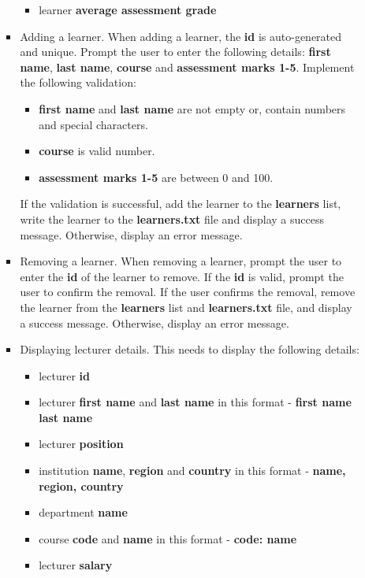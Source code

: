 \documentclass{article}
\begin{document}
\begin{itemize}
\begin{itemize}
\begin{itemize}
\begin{itemize}
                \item learner \textbf{average assessment grade}
            \end{itemize}
            \item Adding a learner. When adding a learner, the \textbf{id} is auto-generated and unique. Prompt the user to enter the following details: \textbf{first name}, \textbf{last name}, \textbf{course} and \textbf{assessment marks 1-5}. Implement the following validation:
            \begin{itemize}
                \item \textbf{first name} and \textbf{last name} are not empty or, contain numbers and special characters.
                \item \textbf{course} is valid number.
                \item \textbf{assessment marks 1-5} are between 0 and 100.
            \end{itemize} 
            If the validation is successful, add the learner to the \textbf{learners} list, write the learner to the \textbf{learners.txt} file and display a success message. Otherwise, display an error message.             
            \item Removing a learner. When removing a learner, prompt the user to enter the \textbf{id} of the learner to remove. If the \textbf{id} is valid, prompt the user to confirm the removal. If the user confirms the removal, remove the learner from the \textbf{learners} list and \textbf{learners.txt} file, and display a success message. Otherwise, display an error message.             
            \item Displaying lecturer details. This needs to display the following details:
            \begin{itemize}
                \item lecturer \textbf{id}
                \item lecturer \textbf{first name} and \textbf{last name} in this format - \textbf{first name last name}
                \item lecturer \textbf{position}
                \item institution \textbf{name}, \textbf{region} and \textbf{country} in this format - \textbf{name, region, country}
                \item department \textbf{name}
                \item course \textbf{code} and \textbf{name} in this format - \textbf{code: name}
                \item lecturer \textbf{salary}

\end{itemize}
\end{itemize}
\end{itemize}
\end{itemize}
\end{document}
